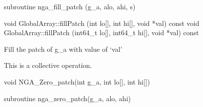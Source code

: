 \documentclass[12pt]{article}
\begin{document}
\begin{fapi}
\begin{fcode}
subroutine nga_fill_patch (g_a, alo, ahi, s)
\end{fcode}
\begin{funcargs}
\end{funcargs}
\end{fapi}

\begin{cxxapi}
\begin{cxxcode}
void GlobalArray::fillPatch (int lo[], int hi[], void *val) const
void GlobalArray::fillPatch (int64_t lo[], int64_t hi[], void *val) const
\end{cxxcode}
\begin{funcargs}
\end{funcargs}
\end{cxxapi}

\begin{desc}

Fill the patch of g_a with value of `val'

This is a collective operation.
\end{desc}


\begin{capi}
\begin{ccode}
void NGA_Zero_patch(int g_a, int lo[], int hi[])
\end{ccode}
\begin{funcargs}
\end{funcargs}
\end{capi}

\begin{fapi}
\begin{fcode}
subroutine nga_zero_patch(g_a, alo, ahi)
\end{fcode}
\begin{funcargs}
\end{funcargs}
\end{fapi}
\end{document}
